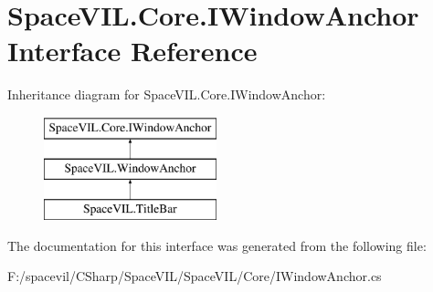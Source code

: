 \hypertarget{interface_space_v_i_l_1_1_core_1_1_i_window_anchor}{}\section{Space\+V\+I\+L.\+Core.\+I\+Window\+Anchor Interface Reference}
\label{interface_space_v_i_l_1_1_core_1_1_i_window_anchor}
Inheritance diagram for Space\+V\+I\+L.\+Core.\+I\+Window\+Anchor\+:\begin{figure}[H]
\begin{center}
\leavevmode
\includegraphics[height=3.000000cm]{interface_space_v_i_l_1_1_core_1_1_i_window_anchor}
\end{center}
\end{figure}


The documentation for this interface was generated from the following file\+:\begin{DoxyCompactItemize}
\item 
F\+:/spacevil/\+C\+Sharp/\+Space\+V\+I\+L/\+Space\+V\+I\+L/\+Core/I\+Window\+Anchor.\+cs\end{DoxyCompactItemize}
